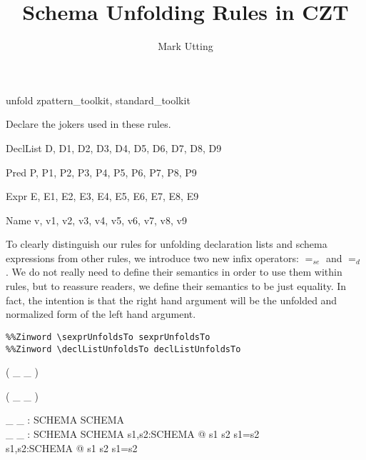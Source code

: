 \documentclass{article}
\title{Schema Unfolding Rules in CZT}
\author{Mark Utting}
\newcommand{\sexprUnfoldsTo}{\mathrel{=_{se}}}
\newcommand{\declListUnfoldsTo}{\mathrel{=_d}}
\begin{document}
\maketitle

\begin{zsection}
  \SECTION unfold \parents zpattern\_toolkit, standard\_toolkit
\end{zsection}

Declare the jokers used in these rules.

\begin{zedjoker}{DeclList} D, D1, D2, D3, D4, D5, D6, D7, D8, D9 \end{zedjoker}
\begin{zedjoker}{Pred} P, P1, P2, P3, P4, P5, P6, P7, P8, P9 \end{zedjoker}
\begin{zedjoker}{Expr} E, E1, E2, E3, E4, E5, E6, E7, E8, E9 \end{zedjoker}
\begin{zedjoker}{Name} v, v1, v2, v3, v4, v5, v6, v7, v8, v9 \end{zedjoker}

To clearly distinguish our rules for unfolding declaration lists and
schema expressions from other rules, we introduce two new infix
operators: $\sexprUnfoldsTo$ and $\declListUnfoldsTo$.  
We do not really need to define their semantics in order to use them within
rules, but to reassure readers, we define their semantics to be just
equality.  In fact, the intention is that the right hand argument
will be the unfolded and normalized form of the left hand argument.

\begin{verbatim}
%%Zinword \sexprUnfoldsTo sexprUnfoldsTo
%%Zinword \declListUnfoldsTo declListUnfoldsTo
\end{verbatim}

\begin{zed}
  \relation ( \_ \sexprUnfoldsTo \_ )
\end{zed}
\begin{zed}
  \relation ( \_ \declListUnfoldsTo \_ )
\end{zed}


\begin{gendef}[SCHEMA]
  \_ \sexprUnfoldsTo \_ : SCHEMA \rel SCHEMA \\
  \_ \declListUnfoldsTo \_ : SCHEMA \rel SCHEMA
\where
  \forall s1,s2:SCHEMA @ s1 \sexprUnfoldsTo s2 \iff s1=s2 \\
  \forall s1,s2:SCHEMA @ s1 \declListUnfoldsTo s2 \iff s1=s2 \\
\end{gendef}
\end{document}
